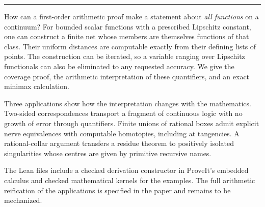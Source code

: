 \documentclass[11pt]{article}
\begin{document}
\thispagestyle{empty}
\par
\vspace{.8em}\par
\vspace{.4em}\par
\vspace{.6em}\par
\vspace{.8em}\hrule\vspace{.8em}
\noindent How can a first-order arithmetic proof make a statement about \emph{all functions} on a continuum? For bounded scalar functions with a prescribed Lipschitz constant, one can construct a finite net whose members are themselves functions of that class. Their uniform distances are computable exactly from their defining lists of points. The construction can be iterated, so a variable ranging over Lipschitz functionals can also be eliminated to any requested accuracy. We give the coverage proof, the arithmetic interpretation of these quantifiers, and an exact minimax calculation.
\par\smallskip
Three applications show how the interpretation changes with the mathematics. Two-sided correspondences transport a fragment of continuous logic with no growth of error through quantifiers. Finite unions of rational boxes admit explicit nerve equivalences with computable homotopies, including at tangencies. A rational-collar argument transfers a residue theorem to positively isolated singularities whose centres are given by primitive recursive names.
\par\smallskip
The Lean files include a checked derivation constructor in ProveIt's embedded calculus and checked mathematical kernels for the examples. The full arithmetic reification of the applications is specified in the paper and remains to be mechanized.
\vspace{.6em}
\setcounter{tocdepth}{1}\tableofcontents
\clearpage







\end{document}
